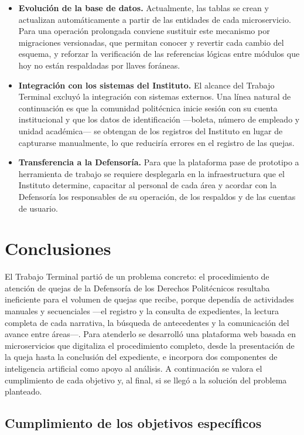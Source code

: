 \begin{itemize}
	\item \textbf{Evolución de la base de datos.} Actualmente, las tablas se crean y actualizan automáticamente a partir de las entidades de cada microservicio. Para una operación prolongada conviene sustituir este mecanismo por migraciones versionadas, que permitan conocer y revertir cada cambio del esquema, y reforzar la verificación de las referencias lógicas entre módulos que hoy no están respaldadas por llaves foráneas.

	\item \textbf{Integración con los sistemas del Instituto.} El alcance del Trabajo Terminal excluyó la integración con sistemas externos. Una línea natural de continuación es que la comunidad politécnica inicie sesión con su cuenta institucional y que los datos de identificación ---boleta, número de empleado y unidad académica--- se obtengan de los registros del Instituto en lugar de capturarse manualmente, lo que reduciría errores en el registro de las quejas.

	\item \textbf{Transferencia a la Defensoría.} Para que la plataforma pase de prototipo a herramienta de trabajo se requiere desplegarla en la infraestructura que el Instituto determine, capacitar al personal de cada área y acordar con la Defensoría los responsables de su operación, de los respaldos y de las cuentas de usuario.
\end{itemize}

\section{Conclusiones}
\label{sec:conclusiones}
El Trabajo Terminal partió de un problema concreto: el procedimiento de atención de quejas de la Defensoría de los Derechos Politécnicos resultaba ineficiente para el volumen de quejas que recibe, porque dependía de actividades manuales y secuenciales ---el registro y la consulta de expedientes, la lectura completa de cada narrativa, la búsqueda de antecedentes y la comunicación del avance entre áreas---. Para atenderlo se desarrolló una plataforma web basada en microservicios que digitaliza el procedimiento completo, desde la presentación de la queja hasta la conclusión del expediente, e incorpora dos componentes de inteligencia artificial como apoyo al análisis. A continuación se valora el cumplimiento de cada objetivo y, al final, si se llegó a la solución del problema planteado.

\subsection*{Cumplimiento de los objetivos específicos}

